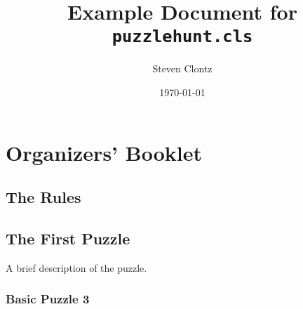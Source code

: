 \documentclass{puzzlehunt}
\title{Example Document for \texttt{puzzlehunt.cls}}
\author{Steven Clontz}
\date{\today}
\begin{document}
\frontmatter %

\puzzlehuntTitlePage %
\tableofcontents %


\mainmatter %

\part{Organizers' Booklet}

\chapter{The Rules}
\lipsum[4-57]

\chapter{The First Puzzle}
A brief description of the puzzle.

\section{Basic Puzzle 3}
\lipsum[6-10]
\end{document}
